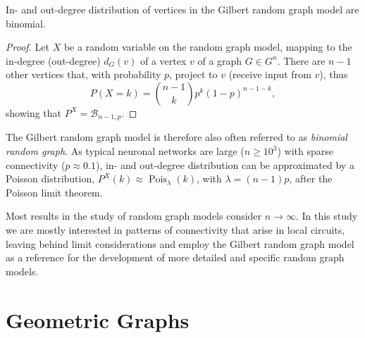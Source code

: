 \begin{proposition}
  In- and out-degree distribution of vertices in the Gilbert random
  graph model are binomial.
\end{proposition}
%
\begin{proof}
  Let $X$ be a random variable on the random graph model, mapping to
  the in-degree (out-degree) $d_G(v)$ of a vertex $v$ of a graph $G
  \in G^n$. There are $n-1$ other vertices that, with probability $p$,
  project to $v$ (receive input from $v$), thus
  \[
    P(X=k) = \binom{n-1}{k} p^k (1-p)^{n-1-k},%
  \]%
  showing that $P^X = \mathcal{B}_{n-1,p}$.
\end{proof}

The Gilbert random graph model is therefore also often referred to as
\textit{binomial random graph}. %
As typical neuronal networks are large ($n \geq 10^3$) with sparse
connectivity ($p \approx 0.1$), in- and out-degree distribution can be
approximated by a Poisson distribution, $P^X(k) \approx
\operatorname{Pois}_{\lambda}(k)$, with $\lambda = (n-1)p$, after the
Poisson limit theorem.

Most results in the study of random graph models consider $n\to
\infty$. In this study we are mostly interested in patterns of
connectivity that arise in local circuits, leaving behind limit
considerations and employ the Gilbert random graph model as a
reference for the development of more detailed and specific random
graph models.










\section{Geometric Graphs}\label{sec:geometric_graphs} 


